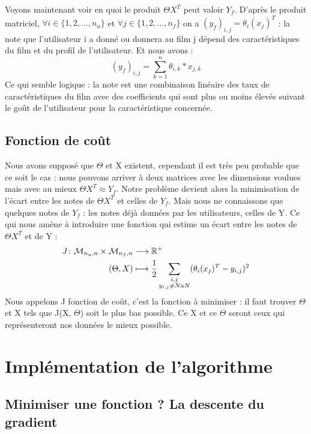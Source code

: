 \documentclass[a4paper,10pt]{article}
\begin{document}
Voyons maintenant voir en quoi le produit $\Theta X^T$ peut valoir $Y_f$. D'après le produit matriciel, $\forall i \in \{1, 2, ..., n_u\}$ et $\forall j \in \{1, 2, ..., n_f\}$ on a $(y_{f})_{i,j} = \theta_{i}(x_{j})^{T}$ : la note que l'utilisateur i a donné ou donnera au film j dépend des caractéristiques du film et du profil de l'utilisateur. Et nous avons :
\[(y_{f})_{i,j} = \sum_{k = 1}^{n} \theta_{i,k} * x_{j,k}\]
Ce qui semble logique : la note est une combinaison linéaire des taux de caractéristiques du film avec des coefficients qui sont plus ou moins élevés suivant le goût de l'utilisateur pour la caractéristique concernée.

\subsection{Fonction de coût}

Nous avons supposé que $\Theta$ et X existent, cependant il est très peu probable que ce soit le cas : nous pouvons arriver à deux matrices avec les dimensions voulues mais avec au mieux $\Theta X^T \approx Y_f$. Notre problème devient alors la minimisation de l'écart entre les notes de $\Theta X^T$ et celles de $Y_f$. Mais nous ne connaissons que quelques notes de $Y_f$ : les notes déjà données par les utilisateurs, celles de Y. Ce qui nous amène à introduire une fonction qui estime un écart entre les notes de $\Theta X^T$ et de Y :
\begin{align*}
J\colon{\cal M}_{n_u, n} \times {\cal M}_{n_f, n} &\longrightarrow \mathbb{R}^+\\
(\Theta, X)&\longmapsto \frac{1}{2}\sum_{\substack{i,j \\ y_{i,j} \ne NaN}}(\theta_{i}(x_{j})^{T}-y_{i,j})^{2}
\end{align*}
Nous appelons J fonction de coût, c'est la fonction à minimiser : il faut trouver $\Theta$ et X tels que J(X, $\Theta$) soit le plus bas possible. Ce X et ce $\Theta$ seront ceux qui représenteront nos données le mieux possible.

\section{Implémentation de l'algorithme}
\subsection{Minimiser une fonction ? La descente du gradient}
\end{document}
